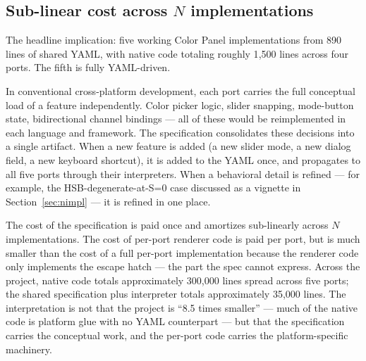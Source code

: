 \documentclass[10pt]{article}
\begin{document}
\subsection{Sub-linear cost across $N$ implementations}

The headline implication: five working Color Panel implementations from
890 lines of shared YAML, with native code totaling roughly 1{,}500 lines
across four ports. The fifth is fully YAML-driven.

In conventional cross-platform development, each port carries the full
conceptual load of a feature independently. Color picker logic, slider
snapping, mode-button state, bidirectional channel bindings --- all of
these would be reimplemented in each language and framework. The
specification consolidates these decisions into a single artifact. When a
new feature is added (a new slider mode, a new dialog field, a new
keyboard shortcut), it is added to the YAML once, and propagates to all
five ports through their interpreters. When a behavioral detail is refined
--- for example, the HSB-degenerate-at-S=0 case discussed as a vignette in
Section~\ref{sec:nimpl} --- it is refined in one place.

The cost of the specification is paid once and amortizes sub-linearly
across $N$ implementations. The cost of per-port renderer code is paid per
port, but is much smaller than the cost of a full per-port implementation
because the renderer code only implements the escape hatch --- the part
the spec cannot express. Across the project, native code totals
approximately 300{,}000 lines spread across five ports; the shared
specification plus interpreter totals approximately 35{,}000 lines. The
interpretation is not that the project is ``8.5 times smaller'' --- much
of the native code is platform glue with no YAML counterpart --- but that
the specification carries the conceptual work, and the per-port code
carries the platform-specific machinery.
\end{document}
